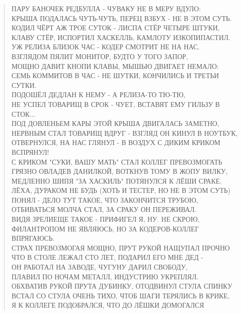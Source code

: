 \begin{verse}
ПАРУ БАНОЧЕК РЕДБУЛЛА - ЧУВАКУ НЕ В МЕРУ ВДУЛО:\\
КРЫША ПОДАЛАСЬ ЧУТЬ-ЧУТЬ, ПЕРЕЦ ВЗБУХ - НЕ В ЭТОМ СУТЬ.\\
КОДИЛ ЧЁРТ АЖ ТРОЕ СУТОК - ЛИСПА СТЁР ЧЕТЫРЕ ШТУКИ,\\
КЛАВУ СТЁР, ИСПОРТИЛ ХАСКЕЛЛЬ, КАМЛОТУ ИЗКОПИПАСТИЛ.\\
УЖ РЕЛИЗА БЛИЗОК ЧАС - КОДЕР СМОТРИТ НЕ НА НАС.\\
ВЗГЛЯДОМ ПЯЛИТ МОНИТОР, БУДТО У ТОГО ЗАПОР,\\
МОЩНО ДАВИТ КНОПИ КЛАВЫ, МЫШЬЮ ДВИГАЕТ НЕМАЛО:\\
СЕМЬ КОММИТОВ В ЧАС  - НЕ ШУТКИ, КОНЧИЛИСЬ И ТРЕТЬИ СУТКИ.\\
ПОДОШЁЛ ДЕДЛАН К НЕМУ - А РЕЛИЗА-ТО ТЮ-ТЮ,\\
НЕ УСПЕЛ ТОВАРИЩ В СРОК - ЧУЕТ, ВСТАВЯТ ЕМУ ГИЛЬЗУ В СТОК...\\
ПОД ДОВЛЕНЬЕМ КАРЫ ЭТОЙ КРЫША ДВИГАЛАСЬ ЗАМЕТНО,\\
НЕРВНЫМ СТАЛ ТОВАРИЩ ВДРУГ - ВЗГЛЯД ОН КИНУЛ В НОУТБУК,\\
ОТВЕРНУЛСЯ, НА НАС ГЛЯНУЛ - В ВОЗДУХ С ДИКИМ КРИКОМ ВСПРЯНУЛ!\\
С КРИКОМ "СУКИ, ВАШУ МАТЬ" СТАЛ КОЛЛЕГ ПРЕВОЗМОГАТЬ\\
ГРЯЗНО ОВЛАДЕВ ДАНИЛКОЙ, ВОТКНУВ ТОМУ В ЖОПУ ВИЛКУ,\\
МЕДЛЕННО ШИПЯ "ЗА ХАСКИЛЬ" ПОТЯНУЛСЯ К ЛЁШИ СРАКЕ.\\
ЛЁХА, ДУРАКОМ НЕ БУДЬ (ХОТЬ И ТЕСТЕР, НО НЕ В ЭТОМ СУТЬ)\\
ПОНЯЛ - ДЕЛО ТУТ ТАКОЕ, ЧТО ЗАКОНЧИТСЯ ТРУБОЮ,\\
ОТБИВАТЬСЯ МОЛЧА СТАЛ, ЗА СРАКУ ОН ПЕРЕЖИВАЛ.\\
ВИДЯ ЗРЕЛИЕЩЕ ТАКОЕ - ПРИФИГЕЛ Я, НУ. НЕ СКРОЮ,\\
ФИЛАНТРОПОМ НЕ ЯВЛЯЮСЬ, НО ЗА КОДЕРОВ-КОЛЛЕГ ВПРЯГАЮСЬ.\\
СТРАХ ПРЕВОЗМОГАЯ МОЩНО, ПРУТ РУКОЙ НАЩУПАЛ ПРОЧНО\\
ЧТО В СТОЛЕ ЛЕЖАЛ СТО ЛЕТ, ПОДАРИЛ ЕГО МНЕ ДЕД - \\
ОН РАБОТАЛ НА ЗАВОДЕ, ЧУГУНУ ДАРИЛ СВОБОДУ,\\
ПЛАВИЛ ПО НОЧАМ МЕТАЛЛ, ИНДУСТРИЮ УКРЕПЛЯЛ.\\
ОБХВАТИВ РУКОЙ ПРУТА ДУБИНКУ, ОТОДВИНУЛ СТУЛА СПИНКУ\\
ВСТАЛ СО СТУЛА ОЧЕНЬ ТИХО, ЧТОБ ШАГИ ТЕРЯЛИСЬ В КРИКЕ,\\
Я К КОЛЛЕГЕ ПОДОБРАЛСЯ, ЧТО ДО ЛЁШКИ ДОМОГАЛСЯ\\

\end{verse}
